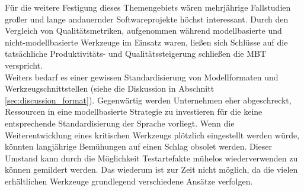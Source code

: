 Für die weitere Festigung dieses Themengebiets wären mehrjährige Fallstudien großer und lange andauernder Softwareprojekte höchst interessant. Durch den Vergleich von Qualitätsmetriken, aufgenommen während modellbasierte und nicht-modellbasierte Werkzeuge im Einsatz waren, ließen sich Schlüsse auf die tatsächliche Produktivitäts- und Qualitätssteigerung schließen die \Gls{MBT} verspricht.\\
Weiters bedarf es einer gewissen Standardisierung von Modellformaten und Werkzeugschnittstellen (siehe die Diskussion in Abschnitt \ref{sec:discussion_format}). Gegenwärtig werden Unternehmen eher abgeschreckt, Ressourcen in eine modellbasierte Strategie zu investieren für die keine entsprechende Standardisierung der Sprache vorliegt. Wenn die Weiterentwicklung eines kritischen Werkzeugs plötzlich eingestellt werden würde, könnten langjährige Bemühungen auf einen Schlag obsolet werden. Dieser Umstand kann durch die Möglichkeit Testartefakte mühelos wiederverwenden zu können gemildert werden. Das wiederum ist zur Zeit nicht möglich, da die vielen erhältlichen Werkzeuge grundlegend verschiedene Ansätze verfolgen.




























